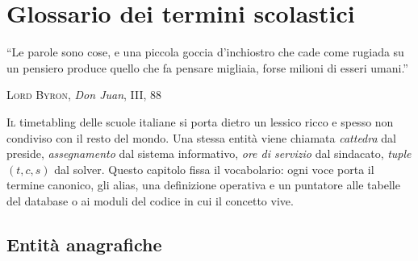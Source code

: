 \chapter{Glossario dei termini scolastici}
\label{ch:terminologia_didattica}

\epigraph{``Le parole sono cose, e una piccola goccia
d'inchiostro che cade come rugiada su un pensiero produce
quello che fa pensare migliaia, forse milioni di esseri
umani.''}{\textsc{Lord Byron}, \emph{Don Juan}, III, 88}

\lettrine[lines=3]{I}{l} timetabling delle scuole italiane si
porta dietro un lessico ricco e spesso non condiviso con il
resto del mondo. Una stessa entit\`a viene chiamata
\emph{cattedra} dal preside, \emph{assegnamento} dal sistema
informativo, \emph{ore di servizio} dal sindacato, \emph{tuple
$(t,c,s)$} dal solver. Questo capitolo fissa il vocabolario:
ogni voce porta il termine canonico, gli alias, una definizione
operativa e un puntatore alle tabelle del database o ai moduli
del codice in cui il concetto vive.

\section{Entit\`a anagrafiche}

